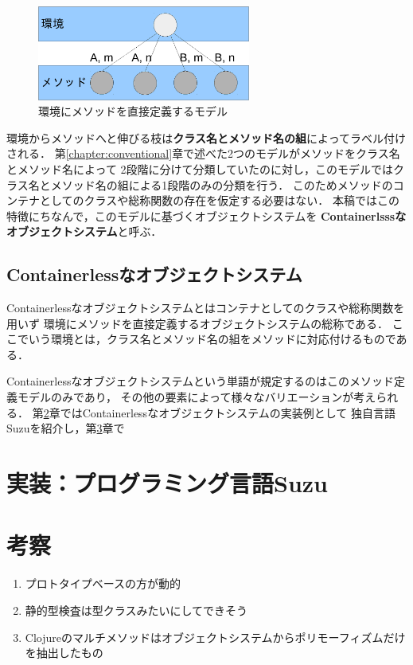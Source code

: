 \documentclass[a4paper,11pt,dvipdfmx]{jreport}
\begin{document}
\begin{figure}[htbp]
	\centering
	\includegraphics[width=7cm]{fig/trees_containerless-crop.pdf}
	\caption{環境にメソッドを直接定義するモデル}
	\label{figure:containerlsss-model}
\end{figure}

環境からメソッドへと伸びる枝は\textbf{クラス名とメソッド名の組}によってラベル付けされる．
第\ref{chapter:conventional}章で述べた2つのモデルがメソッドをクラス名とメソッド名によって
2段階に分けて分類していたのに対し，このモデルではクラス名とメソッド名の組による1段階のみの分類を行う．
このためメソッドのコンテナとしてのクラスや総称関数の存在を仮定する必要はない．
本稿ではこの特徴にちなんで，このモデルに基づくオブジェクトシステムを
\textbf{Containerlsssなオブジェクトシステム}と呼ぶ．

\section{Containerlessなオブジェクトシステム}

Containerlessなオブジェクトシステムとはコンテナとしてのクラスや総称関数を用いず
環境にメソッドを直接定義するオブジェクトシステムの総称である．
ここでいう環境とは，クラス名とメソッド名の組をメソッドに対応付けるものである．

Containerlessなオブジェクトシステムという単語が規定するのはこのメソッド定義モデルのみであり，
その他の要素によって様々なバリエーションが考えられる．
第\ref{chapter:suzu}章ではContainerlessなオブジェクトシステムの実装例として
独自言語Suzuを紹介し，第\ref{chapter:discussion}章で


\chapter{実装：プログラミング言語Suzu}
\label{chapter:suzu}

\chapter{考察}
\label{chapter:discussion}

\begin{enumerate}
\item プロトタイプベースの方が動的
\item 静的型検査は型クラスみたいにしてできそう
\item Clojureのマルチメソッドはオブジェクトシステムからポリモーフィズムだけを抽出したもの
\end{enumerate}
\end{document}
